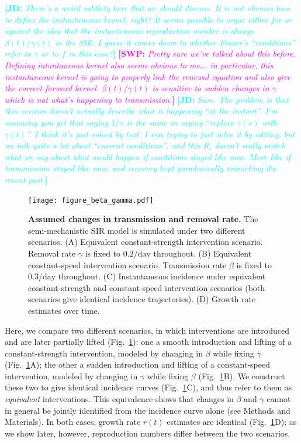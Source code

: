 \documentclass[12pt]{article}
\newcommand{\comment}{}
\renewcommand{\comment}{\nocomment}
\renewcommand{\comment}{\showcomment}
\newcommand{\showcomment}[3]{\textcolor{#1}{\textbf{[#2: }\textsl{#3}\textbf{]}}}
\newcommand{\nocomment}[3]{}
\newcommand{\jd}[1]{\comment{cyan}{JD}{#1}}
\newcommand{\swp}[1]{\comment{magenta}{SWP}{#1}}
\newcommand{\fref}[1]{Fig.~\ref{fig:#1}}
\newcommand{\pday}{\ensuremath{/\textrm{day}}}
\begin{document}
\jd{There's a weird subtlety here that we should discuss. It is not obvious how to define the instantaneous kernel, right? It seems possible to argue either for or against the idea that the instantaneous reproduction number is always $\beta(t)/\gamma(t)$ in the SIR. I guess it comes down to whether Fraser's “conditions” refer to $\gamma$ or to $f$ in this case?}
\swp{Pretty sure we've talked about this before. Defining intantaneous kernel also seems obvious to me... in particular, this instantaneous kernel is going to properly link the renewal equation and also give the correct forward kernel. $\beta(t)/\gamma(t)$ is sensitive to sudden changes in $\gamma$ which is not what's happening to transmission.}
\jd{Sure. The problem is that this version doesn't actually describe what is happening “at the instant”. I'm assuming you get that saying $1/\gamma$ is the same as saying “replace $\gamma(s)$ with $\gamma(t)$”. I think it's just solved by text. I was trying to just solve it by editing, but we talk quite a lot about “current conditions”, and this $R_i$ doesn't really match what we say about what would happen if conditions stayed like now. More like if transmission stayed like now, and recovery kept paradoxically mimicking the recent past.} 

\begin{figure}[!ht]
\texttt{[image: figure\_beta\_gamma.pdf]}
\caption{
\textbf{Assumed changes in transmission and removal rate.}
The semi-mechanistic SIR model is simulated under two different scenarios.
(A) Equivalent constant-strength intervention scenario.
Removal rate $\gamma$ is fixed to $0.2\pday$ throughout.
(B) Equivalent constant-speed intervention scenario.
Transmission rate $\beta$ is fixed to $0.3\pday$ throughout.
(C) Instantaneous incidence under equivalent constant-strength and constant-speed intervention scenarios (both scenarios give identical incidence trajectories).
(D) Growth rate estimates over time.
}
\label{fig:assumption}
\end{figure}

Here, we compare two different scenarios, in which interventions are introduced and are later partially lifted (\fref{assumption}): one a smooth introduction and lifting of a constant-strength intervention, modeled by changing in $\beta$ while fixing $\gamma$ (\fref{assumption}A); the other a sudden introduction and lifting of a constant-speed intervention, modeled by changing in $\gamma$ while fixing $\beta$ (\fref{assumption}B).
We construct these two to give identical incidence curves (\fref{assumption}C), and thus refer to them as \emph{equivalent} interventions.
This equivalence shows that changes in $\beta$ and $\gamma$ cannot in general be jointly identified from the incidence curve alone (see Methods and Materials).
In both cases, growth rate $r(t)$ estimates are identical (\fref{assumption}D); as we show later, however, reproduction numbers differ between the two scenarios.
\end{document}
